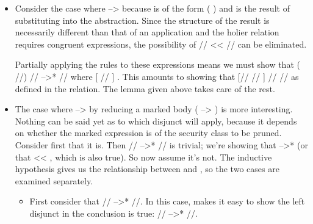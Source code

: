\documentclass[12pt]{report}
\begin{document}
\begin{itemize}
\item  Consider the case where  -->  because  is of the form 
  (   )  and  is the result of substituting 
  into the abstraction. Since the structure of the result is
  necessarily different than that of an application and the holier
  relation requires congruent expressions, the possibility of 
   // <<   // can be eliminated.


  Partially applying the  rules to these expressions means we
  must show that  (   //) // -->* //
  where [ // ]   . This amounts to showing that
  [// // ] //  // as defined in the 
  relation. The  lemma given above takes care of
  the rest.



\item  The case where  -->  by reducing a marked body ( 
   -->   ) is more interesting. Nothing can be
  said yet as to which disjunct will apply, because it depends on
  whether the marked expression is of the security class to be
  pruned. Consider first that it is. Then   //
  -->*   // is trivial; we're showing that 
  -->*  (or that  << , which is also true). So now
     assume it's not. The inductive hypothesis gives us the
     relationship between  and , so the two cases are
     examined separately.



\begin{itemize}
\item  First consider that // -->* //. In this case,
     makes it easy to show the left
    disjunct in the conclusion is true:   // -->*
      //.




\end{itemize}
\end{itemize}
\end{document}
